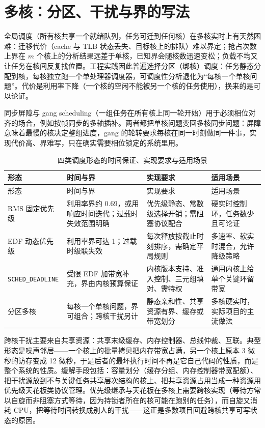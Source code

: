 \documentclass[12pt,a4paper,fontset=fandol]{ctexbook}
\newcommand{\Tp}[1]{\texttt{#1}}
\newcommand{\Bk}{\discretionary{}{}{}}
\begin{document}
\section{多核：分区、干扰与界的写法}

全局调度（所有核共享一个就绪队列，任务可迁到任何核）在多核实时上有天然困难：迁移代价（cache 与 TLB 状态丢失、目标核上的排队）难以界定；抢占次数上界在 $m$ 个核上的分析结果远差于单核，已知界会随核数迅速变松；负载不均又让任务在核间反复找位置。工程实践因此普遍选择分区（绑核）调度：任务静态分配到核，每核独立跑一个单处理器调度器，可调度性分析退化为“每核一个单核问题”。代价是利用率下降（一个核的空闲不能被另一个核的任务使用），换来的是可以论证。

同步屏障与 gang scheduling（一组任务在所有核上同一轮开始）用于必须相位对齐的场合，例如按帧同步的多轴插补。两者都把单核问题变回多核同步问题：屏障意味着最慢的核决定整组进度，gang 的轮转要求每核在同一时刻做同一件事，实现代价高、界难写，只在确实需要相位锁定的系统里用。

\begin{longtable}{>{\raggedright\arraybackslash}p{} >{\raggedright\arraybackslash}p{} >{\raggedright\arraybackslash}p{} >{\raggedright\arraybackslash}p{}}
\caption{四类调度形态的时间保证、实现要求与适用场景}\label{tab:ch10-alg}\\
\toprule
形态 & 时间与界 & 实现要求 & 适用场景 \\
\midrule
\endfirsthead
\toprule
形态 & 时间与界 & 实现要求 & 适用场景 \\
\midrule
\endhead
\bottomrule
\endfoot
\endlastfoot
RMS 固定优先级 & 利用率界约 0.69，或用响应时间迭代；过载时失效范围明确 & 优先级静态、常数级选择开销；需阻塞协议配合 & 硬实时控制环，任务数少且可论证 \\
\addlinespace
EDF 动态优先级 & 利用率界可达 1；过载时级联失效 & 每次释放按截止时刻排序，需确定平局规则 & 多速率、软实时混合，允许降级策略 \\
\addlinespace
\Tp{SCHED\_{\Bk}DEADLINE} & 受限 EDF 加带宽补充，界由内核预算保证 & 内核版本支持、准入控制、三元组填对、需特权 & 通用内核上给单个关键环留带宽 \\
\addlinespace
分区多核 & 每核一个单核问题，界可组合；跨核干扰另计 & 静态亲和性、共享资源有界、缓存或带宽划分 & 多核硬实时，实际项目的主流做法 \\
\end{longtable}

跨核干扰主要来自共享资源：共享末级缓存、内存控制器、总线仲裁、互联。典型形态是噪声邻居——一个核上的批量拷贝把内存带宽占满，另一个核上原本 3 微秒的访存变成 12 微秒，于是后者的最坏执行时间不再是它自己代码的性质，而是整个系统的性质。缓解手段包括：容量划分（缓存分组、内存控制器带宽配额）、把干扰源放到不与关键任务共享层次结构的核上、把共享资源占用当成一种资源用优先级天花板类协议管理。优先级继承与天花板在多核上需要跨核实现（等待方常以自旋而非阻塞方式等待，因为持锁者所在的核可能在跑别的任务），而自旋又消耗 CPU，把等待时间转换成别人的干扰——这正是多数项目回避跨核共享可写状态的原因。
\end{document}

